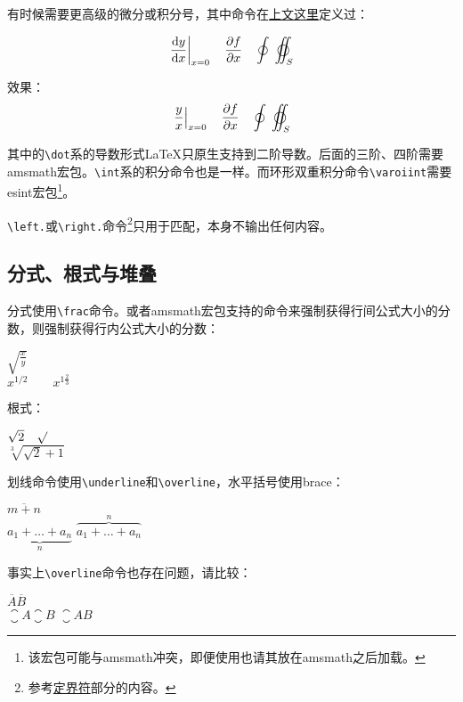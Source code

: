 {有时候需要更高级的微分或积分号，其中\latexline{\\ud}命令在\hyperref[cmd:ud]{上文这里}定义过：
\begin{latex}{}
\[\left.\frac{\ud y}{\ud x}\right|_{x=0}
\quad\frac{\partial f}{\partial x}
\quad\oint\;\varoiint_S \]
\end{latex}

效果：
\[\left.\frac{y}{x}\right|_{x=0}
\quad\frac{\partial f}{\partial x}\quad
\oint\;\varoiint_S \]

其中的\verb|\dot|系的导数形式\LaTeX 只原生支持到二阶导数。后面的三阶、四阶需要amsmath宏包。\verb|\int|系的积分命令也是一样。而环形双重积分命令\verb|\varoiint|需要esint宏包\footnote{该宏包可能与amsmath冲突，即便使用也请其放在amsmath之后加载。}。

\verb|\left.|或\verb|\right.|命令\footnote{参考\hyperref[subsec:delimiter]{定界符}部分的内容。}只用于匹配，本身不输出任何内容。

\subsection{分式、根式与堆叠}
分式使用\verb|\frac|命令。或者amsmath宏包支持的\latexline{\\dfrac}命令来强制获得行间公式大小的分数，\latexline{\\tfrac}则强制获得行内公式大小的分数：

\begin{codeshow}
  $\sqrt{\frac{x}{y}}$ \\
  $x^{1/2} \qquad x^{1\frac{2}{3}}$
\end{codeshow}

根式：

\begin{codeshow}
  $\sqrt{2} \quad \surd$ \\
  $\sqrt[3]{\sqrt{2}+1}$
\end{codeshow}

划线命令使用\verb|\underline|和\verb|\overline|，水平括号使用brace：

\begin{codeshow}
$\overline{m+n}$ \\
$\underbrace{a_1+\ldots+a_n}_{n}$
$\overbrace{a_1+\ldots+a_n}^{n}$
\end{codeshow}

事实上\verb|\overline|命令也存在问题，请比较：

\begin{codeshow}
$\overline{A}\overline{B}$ \\
$\closure{A}\closure{B}$
$\closure{AB}$
\end{codeshow}

}
